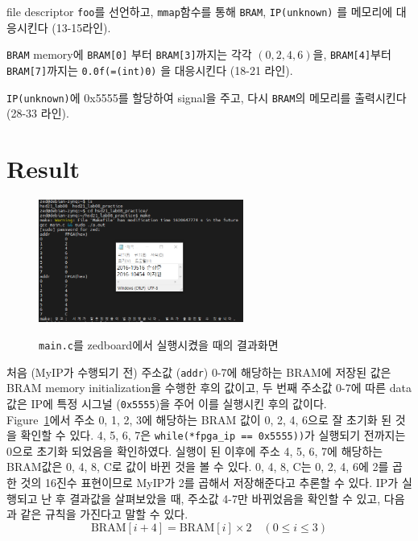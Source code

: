 \documentclass{article}
\begin{document}
\begin{itemize*}
\item file descriptor \texttt{foo}를 선언하고, \texttt{mmap}함수를 통해 \texttt{BRAM}, \texttt{IP(unknown)} 를 메모리에 대응시킨다 (13-15라인).\\
\item \texttt{BRAM} memory에 \texttt{BRAM[0]} 부터 \texttt{BRAM[3]}까지는 각각 $(0, 2, 4, 6)$을, \texttt{BRAM[4]}부터 \texttt{BRAM[7]}까지는 \texttt{0.0f(=(int)0)} 을 대응시킨다 (18-21 라인).\\
\item  \texttt{IP(unknown)}에 0x5555를 할당하여 signal을 주고, 다시 \texttt{BRAM}의 메모리를 출력시킨다 (28-33 라인).
\end{itemize*}

\section{Result}
\begin{figure}[ht]
	\centering
	\includegraphics[width=0.6\textwidth]{fig/result.PNG}
\label{fig3}
\caption{\texttt{main.c}를 zedboard에서 실행시켰을 때의 결과화면}
\end{figure}
처음 (MyIP가 수행되기 전) 주소값 (\texttt{addr}) 0-7에 해당하는 BRAM에 저장된 값은 BRAM memory initialization을 수행한 후의 값이고, 두 번째 주소값 0-7에 따른 data값은 IP에 특정 시그널 (\texttt{0x5555})을 주어 이를 실행시킨 후의 값이다. \\

Figure~\ref{fig3}에서 주소 0, 1, 2, 3에 해당하는 BRAM 값이 0, 2, 4, 6으로 잘 초기화 된 것을 확인할 수 있다. 4, 5, 6, 7은 \texttt{while(*fpga\_ip == 0x5555))}가 실행되기 전까지는 0으로 초기화 되었음을 확인하였다. 실행이 된 이후에 주소 4, 5, 6, 7에 해당하는 BRAM값은 0, 4, 8, C로 값이 바뀐 것을 볼 수 있다. 0, 4, 8, C는 0, 2, 4, 6에 2를 곱한 것의 16진수 표현이므로 MyIP가 2를 곱해서 저장해준다고 추론할 수 있다. IP가 실행되고 난 후 결과값을 살펴보았을 때, 주소값 4-7만 바뀌었음을 확인할 수 있고, 다음과 같은 규칙을 가진다고 말할 수 있다.
\begin{equation}
\textrm{BRAM}[i+4] = \textrm{BRAM}[i] \times 2 \quad (0\leq i \leq3)
\label{eqn}
\end{equation}
\end{document}
